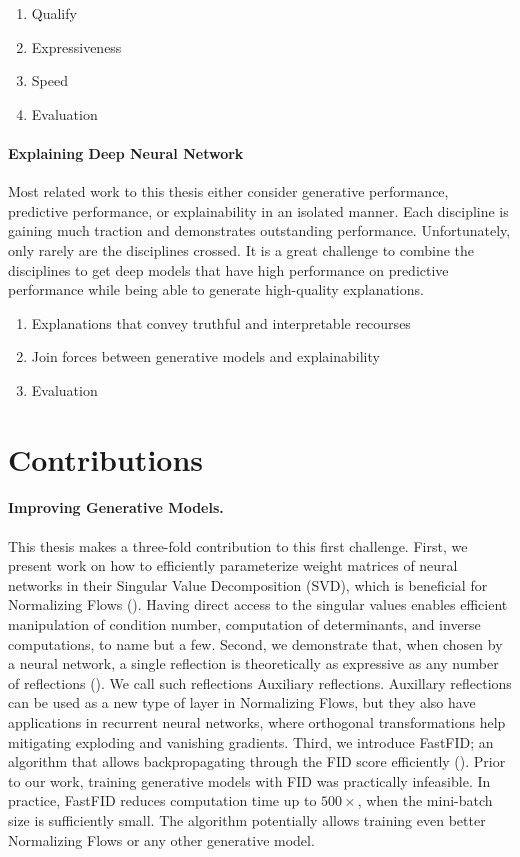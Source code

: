 \begin{enumerate}
    \item Qualify
    \item Expressiveness
    \item Speed
    \item Evaluation
\end{enumerate}

\paragraph{Explaining Deep Neural Network}
Most related work to this thesis either consider generative performance, predictive performance, or explainability in an isolated manner. 
Each discipline is gaining much traction and demonstrates outstanding performance.
Unfortunately, only rarely are the disciplines crossed. 
It is a great challenge to combine the disciplines to get deep models that have high performance on predictive performance while being able to generate high-quality explanations.

\begin{enumerate}
    \item Explanations that convey truthful and interpretable recourses
    \item Join forces between generative models and explainability
    \item Evaluation
\end{enumerate}

\section{Contributions}\label{sec:contributions}
\paragraph{Improving Generative Models.} 
This thesis makes a three-fold contribution to this first challenge. 
First, we present work on how to efficiently parameterize weight matrices of neural networks in their Singular Value Decomposition (SVD), which is beneficial for Normalizing Flows (). 
Having direct access to the singular values enables efficient manipulation of condition number, computation of determinants, and inverse computations, to name but a few.
Second, we demonstrate that, when chosen by a neural network, a single reflection is theoretically as expressive as any number of reflections ().
We call such reflections Auxiliary reflections.
Auxillary reflections can be used as a new type of layer in Normalizing Flows, but they also have applications in recurrent neural networks, where orthogonal transformations help mitigating exploding and vanishing gradients. 
Third, we introduce FastFID; an algorithm that allows backpropagating through the FID score efficiently (). 
Prior to our work, training generative models with FID was practically infeasible.
In practice, FastFID reduces computation time up to $500\times$, when the mini-batch size is sufficiently small. 
The algorithm potentially allows training even better Normalizing Flows or any other generative model.

